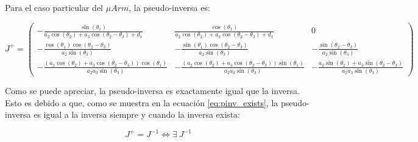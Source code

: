 \documentclass[a4paper,12pt]{article}
\begin{document}
Para el caso particular del $\mu Arm$, la pseudo-inversa es:

\begin{equation}
    J^+ =
    \begin{pmatrix}
        - \frac{\sin{\left(\theta_{1} \right)}}{a_{2} \cos{\left(\theta_{2} \right)} + a_{3} \cos{\left(\theta_{2} - \theta_{3} \right)} + d_{1}}                                                & \frac{\cos{\left(\theta_{1} \right)}}{a_{2}
        \cos{\left(\theta_{2} \right)} + a_{3} \cos{\left(\theta_{2} - \theta_{3} \right)} + d_{1}}                                                                                              & 0                                                                                                                                                                                                                                                                                                                                         \\
        - \frac{\cos{\left(\theta_{1} \right)} \cos{\left(\theta_{2} - \theta_{3} \right)}}{a_{2} \sin{\left(\theta_{3} \right)}}                                                                & - \frac{\sin{\left(\theta_{1} \right)} \cos{\left(\theta_{2} - \theta_{3} \right)}}{a_{2} \sin{\left(\theta_{3} \right)}}                                                                 & - \frac{\sin{\left(\theta_{2} - \theta_{3} \right)}}{a_{2} \sin{\left(\theta_{3} \right)}}                                                    \\
        - \frac{\left(a_{2} \cos{\left(\theta_{2} \right)} + a_{3} \cos{\left(\theta_{2} - \theta_{3} \right)}\right) \cos{\left(\theta_{1} \right)}}{a_{2} a_{3} \sin{\left(\theta_{3}\right)}} & - \frac{\left(a_{2} \cos{\left(\theta_{2} \right)} + a_{3} \cos{\left(\theta_{2} - \theta_{3} \right)}\right) \sin{\left(\theta_{1} \right)}}{a_{2} a_{3} \sin{\left(\theta_{3} \right)}} & - \frac{a_{2} \sin{\left(\theta_{2} \right)} + a_{3} \sin{\left(\theta_{2} - \theta_{3} \right)}}{a_{2} a_{3} \sin{\left(\theta_{3} \right)}}
    \end{pmatrix}
\end{equation}

Como se puede apreciar, la pseudo-inversa es exactamente igual que la inversa. Esto
es debido a que, como se muestra en la ecuación \ref{eq:pinv_exists}, la pseudo-inversa
es igual a la inversa siempre y cuando la inversa exista:

\begin{equation*}
    J^+ = J^{-1} \Leftrightarrow \exists ~ J^{-1}
\end{equation*}
\end{document}
